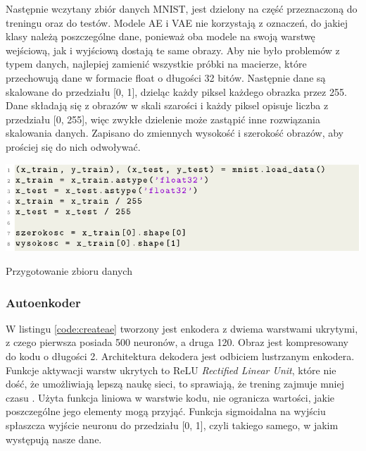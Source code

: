 \documentclass[a4paper,12pt,oneside]{book} %
\begin{document}
Następnie wczytany zbiór danych MNIST, jest dzielony na część przeznaczoną do treningu oraz do testów. Modele AE i VAE nie korzystają z oznaczeń, do jakiej klasy należą poszczególne dane, ponieważ oba modele na swoją warstwę wejściową, jak i wyjściową dostają te same obrazy. Aby nie było problemów z typem danych, najlepiej zamienić wszystkie próbki na macierze, które przechowują dane w formacie float o długości 32 bitów. Następnie dane są skalowane do przedziału [0, 1], dzieląc każdy piksel każdego obrazka przez 255. Dane składają się z obrazów w skali szarości i każdy piksel opisuje liczba z przedziału [0, 255], więc zwykłe dzielenie może zastąpić inne rozwiązania skalowania danych. Zapisano do zmiennych wysokość i szerokość obrazów, aby prościej się do nich odwoływać.
\begin{code}[h!]
	\centering
	\includegraphics[width=\linewidth]{dane.pdf}
	\caption{Przygotowanie zbioru danych}
	\label{code:dataset}
\end{code}
\subsubsection{Autoenkoder}
 W listingu \ref{code:createae} tworzony jest enkodera z dwiema warstwami ukrytymi, z czego pierwsza posiada 500 neuronów, a druga 120. Obraz jest kompresowany do kodu o długości 2. Architektura dekodera jest odbiciem lustrzanym enkodera. Funkcje aktywacji warstw ukrytych to ReLU \textit{Rectified Linear Unit}, które nie dość, że umożliwiają lepszą naukę sieci, to sprawiają, że trening zajmuje mniej czasu \cite{relu}. Użyta funkcja liniowa w warstwie kodu, nie ogranicza wartości, jakie poszczególne jego elementy mogą przyjąć. Funkcja sigmoidalna na wyjściu spłaszcza wyjście neuronu do przedziału [0, 1], czyli takiego samego, w jakim występują nasze dane.\\
\end{document}

